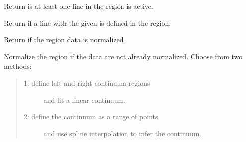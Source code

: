 \documentclass[letterpaper,10pt,english]{sphinxmanual}
\begin{document}
\begin{fulllineitems}
\begin{fulllineitems}
\end{fulllineitems}


\begin{fulllineitems}
\label{\detokenize{api:regions.Region.has_active_lines}}
Return  is at least one line in the region is active.

\end{fulllineitems}


\begin{fulllineitems}
\label{\detokenize{api:regions.Region.has_line}}
Return  if a line with the given  is defined in the region.

\end{fulllineitems}


\begin{fulllineitems}
\label{\detokenize{api:regions.Region.is_normalized}}
Return  if the region data is normalized.

\end{fulllineitems}


\begin{fulllineitems}
\label{\detokenize{api:regions.Region.normalize}}
Normalize the region if the data are not already normalized.
Choose from two methods:
\begin{quote}
\begin{description}
\item[{1:  define left and right continuum regions}] \leavevmode
and fit a linear continuum.

\item[{2:  define the continuum as a range of points}] \leavevmode
and use spline interpolation to infer the
continuum.

\end{description}
\end{quote}


\end{fulllineitems}
\end{fulllineitems}
\end{document}
